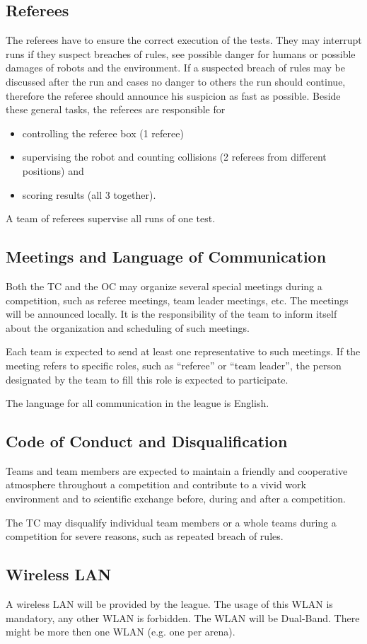 \subsection{Referees}
The referees have to ensure the correct execution of the tests. They may interrupt runs if they suspect breaches of rules, see possible danger for humans or possible damages of robots and the environment. If a suspected breach of rules may be discussed after the run and cases no danger to others the run should continue, therefore the referee should  announce his suspicion as fast as possible. Beside these general tasks, the referees are responsible for
\begin{itemize}
\item controlling the referee box (1 referee)
\item supervising the robot and counting collisions (2 referees from different positions) and
\item scoring results (all 3 together).
\end{itemize}
A team of referees supervise all runs of one test. 

\subsection{Meetings and Language of Communication}
Both the TC and the OC may organize several special meetings during a competition, such as referee meetings, team leader meetings, etc. The meetings will be announced locally. It is the responsibility of the team to inform itself about the organization and scheduling of such meetings.
\par
Each team is expected to send at least one representative to such meetings. If the meeting refers to specific roles, such as “referee” or “team leader”, the person designated by the team to fill this role is expected to participate.
\par
The language for all communication in the league is English.

\subsection{Code of Conduct and Disqualification}
Teams and team members are expected to maintain a friendly and cooperative atmosphere throughout a competition and contribute to a vivid work environment and to scientific exchange before, during and after a competition.
\par
The TC may disqualify individual team members or a whole teams during a competition for severe reasons, such as repeated breach of rules. 

\subsection{Wireless LAN}
A wireless LAN will be provided by the league. The usage of this WLAN is mandatory, any other WLAN is forbidden. The WLAN will be Dual-Band. There might be more then one WLAN (e.g. one per arena). 


